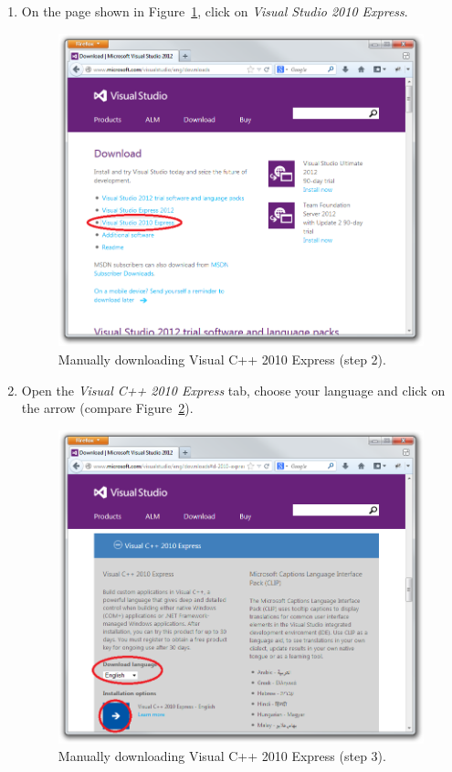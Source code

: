 \begin{enumerate}
\begin{enumerate}
			\item On the page shown in Figure~\ref{fig:setup_vs_download2},
				click on \emph{Visual Studio 2010 Express}.

\begin{figure}[htbp]
	\centering
	\includegraphics[scale=0.4]{figures/setup_vs_download2_edited.png}
	\caption{Manually downloading Visual C++ 2010 Express (step 2).}
	\label{fig:setup_vs_download2}
\end{figure}

			\item Open the \emph{Visual C++ 2010 Express} tab,
				choose your language and click on the arrow (compare Figure~\ref{fig:setup_vs_download3}).

\begin{figure}[htbp]
	\centering
	\includegraphics[scale=0.4]{figures/setup_vs_download3_edited.png}
	\caption{Manually downloading Visual C++ 2010 Express (step 3).}
	\label{fig:setup_vs_download3}
\end{figure}


\end{enumerate}
\end{enumerate}
